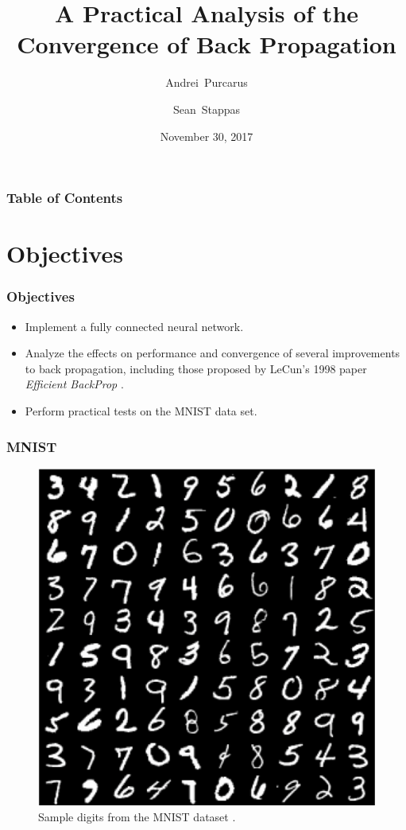 \documentclass[pdf]{beamer}
\title{\textbf{A Practical Analysis of the Convergence of Back Propagation}}
\author{
  Andrei~Purcarus \and Sean~Stappas
}
\institute{
  ECSE 526 \\
  McGill University
}
\date{November 30, 2017}
\begin{document}
\maketitle

\begin{frame}
\frametitle{Table of Contents}
\tableofcontents
\end{frame}


\section{Objectives}

\begin{frame}
\frametitle{Objectives}
\begin{itemize}
  \item Implement a fully connected neural network.
  \item Analyze the effects on performance and convergence of several improvements to back propagation, including those proposed by LeCun's 1998 paper \textit{Efficient BackProp} \cite{lecun_efficient_1998}.
  \item Perform practical tests on the MNIST data set.
\end{itemize}
\end{frame}
\begin{frame}

\frametitle{MNIST}
\begin{figure}[!htb]
  \includegraphics[height=0.7\textheight]{figures/mnist.png}
  \caption{Sample digits from the MNIST dataset \cite{steeves_2015}.}
\end{figure}
\end{frame}
\end{document}
